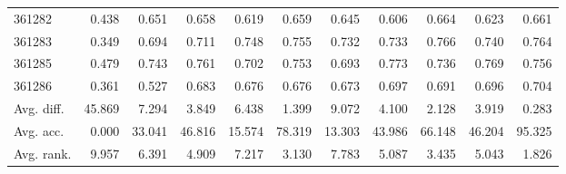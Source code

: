 \begin{tabular}{lrrrrrrrrrr}
361282 & 0.438 & 0.651 & 0.658 & 0.619 & 0.659 & 0.645 & 0.606 & 0.664 & 0.623 & 0.661 \\
361283 & 0.349 & 0.694 & 0.711 & 0.748 & 0.755 & 0.732 & 0.733 & 0.766 & 0.740 & 0.764 \\
361285 & 0.479 & 0.743 & 0.761 & 0.702 & 0.753 & 0.693 & 0.773 & 0.736 & 0.769 & 0.756 \\
361286 & 0.361 & 0.527 & 0.683 & 0.676 & 0.676 & 0.673 & 0.697 & 0.691 & 0.696 & 0.704 \\
Avg. diff. & 45.869 & 7.294 & 3.849 & 6.438 & 1.399 & 9.072 & 4.100 & 2.128 & 3.919 & 0.283 \\
Avg. acc. & 0.000 & 33.041 & 46.816 & 15.574 & 78.319 & 13.303 & 43.986 & 66.148 & 46.204 & 95.325 \\
Avg. rank. & 9.957 & 6.391 & 4.909 & 7.217 & 3.130 & 7.783 & 5.087 & 3.435 & 5.043 & 1.826 \\
\bottomrule
\end{tabular}

